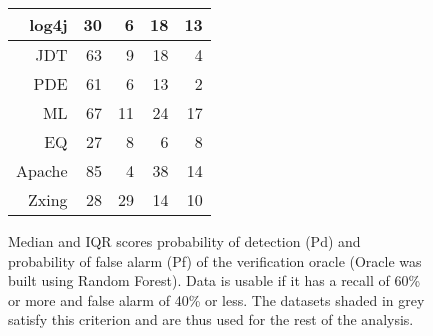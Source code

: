 \begin{figure}[t!]
{\begin{tabular}{r|r|r|r|r}
log4j                                          & 30                       & 6                        & 18                       & 13                       \\ \hline\hline
\cellcolor[HTML]{E0E0E0}JDT & \cellcolor[HTML]{E0E0E0}63 & \cellcolor[HTML]{E0E0E0}9  & \cellcolor[HTML]{E0E0E0}18 & \cellcolor[HTML]{E0E0E0}4  \\
\cellcolor[HTML]{E0E0E0}PDE & \cellcolor[HTML]{E0E0E0}61 & \cellcolor[HTML]{E0E0E0}6  & \cellcolor[HTML]{E0E0E0}13 & \cellcolor[HTML]{E0E0E0}2  \\
\cellcolor[HTML]{E0E0E0}ML  & \cellcolor[HTML]{E0E0E0}67 & \cellcolor[HTML]{E0E0E0}11 & \cellcolor[HTML]{E0E0E0}24 & \cellcolor[HTML]{E0E0E0}17 \\\hline
EQ  & 27 & 8  & 6  & 8  \\\hline\hline
\cellcolor[HTML]{E0E0E0}Apache & \cellcolor[HTML]{E0E0E0}85 & \cellcolor[HTML]{E0E0E0}4  & \cellcolor[HTML]{E0E0E0}38 & \cellcolor[HTML]{E0E0E0}14 \\\hline
Zxing  & 28 & 29 & 14 & 10 \\\hline

\end{tabular}}%
\caption{Median and IQR scores probability of detection (Pd) and probability of false alarm (Pf) of the verification oracle (Oracle was built using Random Forest). Data is usable if it has a recall of 60\% or more and false alarm of 40\% or less. The datasets shaded in \colorbox{cellgrey}{grey} satisfy this criterion and are thus used for the rest of the analysis.}
\label{fig:stats}
\end{figure}